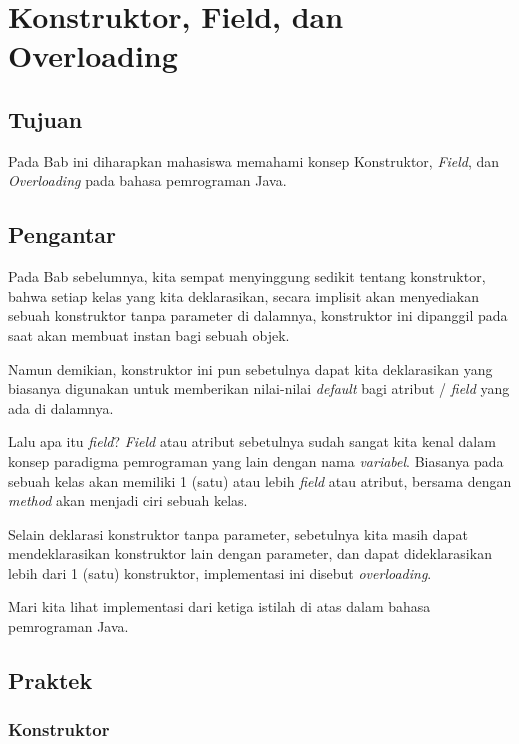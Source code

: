\chapter{Konstruktor, Field, dan Overloading}

\section{Tujuan}

Pada Bab ini diharapkan mahasiswa memahami konsep Konstruktor, \textit{Field}, dan \textit{Overloading} pada bahasa pemrograman Java.

\section{Pengantar}

Pada Bab sebelumnya, kita sempat menyinggung sedikit tentang konstruktor, bahwa setiap kelas yang kita deklarasikan, secara implisit akan menyediakan sebuah konstruktor tanpa parameter di dalamnya, konstruktor ini dipanggil pada saat akan membuat instan bagi sebuah objek.

Namun demikian, konstruktor ini pun sebetulnya dapat kita deklarasikan yang biasanya digunakan untuk memberikan nilai-nilai \textit{default} bagi atribut / \textit{field} yang ada di dalamnya.

Lalu apa itu \textit{field}? \textit{Field} atau atribut sebetulnya sudah sangat kita kenal dalam konsep paradigma pemrograman yang lain dengan nama \textit{variabel}. Biasanya pada sebuah kelas akan memiliki 1 (satu) atau lebih \textit{field} atau atribut, bersama dengan \textit{method} akan menjadi ciri sebuah kelas.

Selain deklarasi konstruktor tanpa parameter, sebetulnya kita masih dapat mendeklarasikan konstruktor lain dengan parameter, dan dapat dideklarasikan lebih dari 1 (satu) konstruktor, implementasi ini disebut \textit{overloading}.

Mari kita lihat implementasi dari ketiga istilah di atas dalam bahasa pemrograman Java.

\section{Praktek}

\subsection{Konstruktor}

